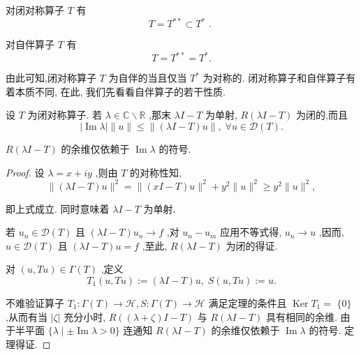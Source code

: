 \documentclass[lang=cn,newtx,10pt,scheme=chinese,thmcnt=chapter]{elegantbook}
\renewcommand{\Im}{\operatorname{Im}}
\begin{document}
对闭对称算子 \(T\) 有
\begin{equation*}
T = {T}^{* * } \subset  {T}^{ * }\text{ . }
\end{equation*}

对自伴算子 \(T\) 有
\begin{equation*}
T = {T}^{* * } = {T}^{ * }.
\end{equation*}

由此可知,闭对称算子 \(T\) 为自伴的当且仅当 \({T}^{ * }\) 为对称的. 闭对称算子和自伴算子有着本质不同, 在此, 我们先看看自伴算子的若干性质.
\begin{proposition}
     设 \(T\) 为闭对称算子. 若 \(\lambda  \in  \mathbb{C} \smallsetminus  \mathbb{R}\) ,那末 \({\lambda I} - T\) 为单射, \(R\left( {{\lambda I} - T}\right)\) 为闭的,而且
\begin{equation*}
\left| {\Im\lambda }\right| \parallel u\parallel  \leq  \parallel \left( {{\lambda I} - T}\right) u\parallel ,\;\forall u \in  \mathcal{D}(T) . \label{5.3}
\end{equation*}

\(R\left( {{\lambda I} - T}\right)\) 的余维仅依赖于 \(\Im\lambda\) 的符号.
\end{proposition}
\begin{proof}
    设 \(\lambda  = x + {iy}\) ,则由 \(T\) 的对称性知,
\begin{equation*}
\parallel \left( {{\lambda I} - T}\right) u{\parallel }^{2} = \parallel \left( {{xI} - T}\right) u{\parallel }^{2} + {y}^{2}\parallel u{\parallel }^{2} \geq  {y}^{2}\parallel u{\parallel }^{2}, \label{5.4}
\end{equation*}

即上式成立. 同时意味着 \({\lambda I} - T\) 为单射.

若 \({u}_{n} \in  \mathcal{D}(T)\) 且 \(\left( {{\lambda I} - T}\right) {u}_{n} \rightarrow  f\) ,对 \({u}_{n} - {u}_{m}\) 应用不等式得, \({u}_{n} \rightarrow  u\) ,因而, \(u \in  \mathcal{D}(T)\) 且 \(\left( {{\lambda I} - T}\right) u = f\) ,至此, \(R\left( {{\lambda I} - T}\right)\) 为闭的得证.

对 \(\left( {u,{Tu}}\right)  \in  \Gamma \left( T\right)\) ,定义
\begin{equation*}
{T}_{1}\left( {u,{Tu}}\right)  \mathrel{\text{ := }} \left( {{\lambda I} - T}\right) u,\;S\left( {u,{Tu}}\right)  \mathrel{\text{ := }} u.
\end{equation*}

不难验证算子 \({T}_{1} : \Gamma \left( T\right)  \rightarrow  \mathcal{H},S : \Gamma \left( T\right)  \rightarrow  \mathcal{H}\) 满足定理的条件且 \(\operatorname{Ker}{T}_{1} =\)  \(\{ 0\}\) ,从而有当 \(\left| \zeta \right|\) 充分小时, \(R\left( {\left( {{\lambda } + \zeta }\right) I - T}\right)\) 与 \(R\left( {{\lambda I} - T}\right)\) 具有相同的余维. 由于半平面 \(\{ \lambda  \mid   \pm  \Im\lambda  > 0\}\) 连通知 \(R\left( {{\lambda I} - T}\right)\) 的余维仅依赖于 \(\Im\lambda\) 的符号. 定理得证.
\end{proof}
\end{document}
